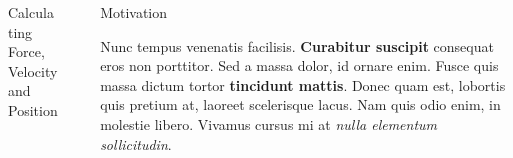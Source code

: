 \documentclass[final, xcolor=dvipsnames]{beamer}
\newlength{\sepwid}
\newlength{\onecolwid}
\newlength{\twocolwid}
\begin{document}
\begin{frame}[t]
\begin{columns}[t]
\begin{column}{\twocolwid}
\begin{columns}[t,totalwidth=\twocolwid]
\begin{column}{\onecolwid}
\begin{block}{Calculating Force, Velocity and Position}
\end{block}


\end{column} %

\end{columns} %

\end{column} %

\begin{column}{\sepwid}\end{column} %

\begin{column}{\onecolwid} %


\begin{block}{Motivation}

Nunc tempus venenatis facilisis. \textbf{Curabitur suscipit} consequat eros non porttitor. Sed a massa dolor, id ornare enim. Fusce quis massa dictum tortor \textbf{tincidunt mattis}. Donec quam est, lobortis quis pretium at, laoreet scelerisque lacus. Nam quis odio enim, in molestie libero. Vivamus cursus mi at \textit{nulla elementum sollicitudin}.

\end{block}


%
%



\end{column}
\end{columns}
\end{frame}
\end{document}
